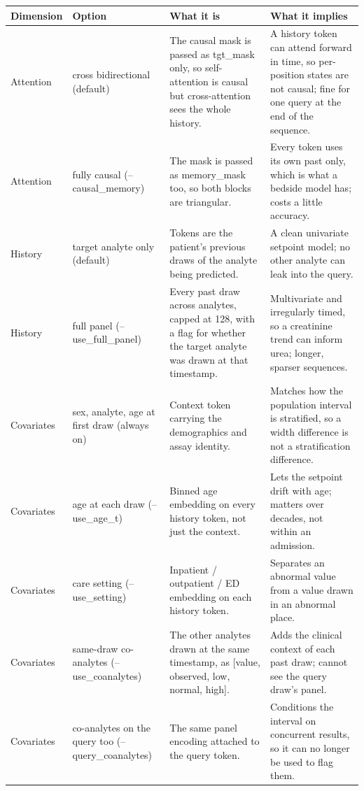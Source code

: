\begin{table}[ht]
\centering
\tiny
\setlength{\tabcolsep}{4pt}
\begin{tabular}{l p{2.4cm} p{6.4cm} p{6.4cm}}
\toprule
Dimension & Option & What it is & What it implies \\
\midrule
Attention & cross bidirectional (default) & The causal mask is passed as tgt\_mask only, so self-attention is causal but cross-attention sees the whole history. & A history token can attend forward in time, so per-position states are not causal; fine for one query at the end of the sequence. \\
Attention & fully causal (--causal\_memory) & The mask is passed as memory\_mask too, so both blocks are triangular. & Every token uses its own past only, which is what a bedside model has; costs a little accuracy. \\
\midrule
History & target analyte only (default) & Tokens are the patient's previous draws of the analyte being predicted. & A clean univariate setpoint model; no other analyte can leak into the query. \\
History & full panel (--use\_full\_panel) & Every past draw across analytes, capped at 128, with a flag for whether the target analyte was drawn at that timestamp. & Multivariate and irregularly timed, so a creatinine trend can inform urea; longer, sparser sequences. \\
\midrule
Covariates & sex, analyte, age at first draw (always on) & Context token carrying the demographics and assay identity. & Matches how the population interval is stratified, so a width difference is not a stratification difference. \\
Covariates & age at each draw (--use\_age\_t) & Binned age embedding on every history token, not just the context. & Lets the setpoint drift with age; matters over decades, not within an admission. \\
Covariates & care setting (--use\_setting) & Inpatient / outpatient / ED embedding on each history token. & Separates an abnormal value from a value drawn in an abnormal place. \\
Covariates & same-draw co-analytes (--use\_coanalytes) & The other analytes drawn at the same timestamp, as [value, observed, low, normal, high]. & Adds the clinical context of each past draw; cannot see the query draw's panel. \\
Covariates & co-analytes on the query too (--query\_coanalytes) & The same panel encoding attached to the query token. & Conditions the interval on concurrent results, so it can no longer be used to flag them. \\

\end{tabular}
\end{table}
